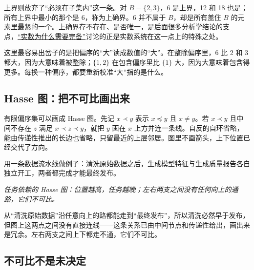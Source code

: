 上界则放弃了``必须在子集内''这一条。对 \(B=\{2,3\}\)，6 是上界，12 和 18 也是；所有上界中最小的那个是 6，称为上确界。6 并不属于 \(B\)，却是所有盖住 \(B\) 的元素里最紧的一个。上确界存不存在、是否唯一，是后面很多分析学结论的支点，\hyperref[ch:097]{``实数为什么需要完备''}讨论的正是实数系统在这一点上的特殊之处。

这里最容易出岔子的是把偏序的``大''读成数值的``大''。在整除偏序里，6 比 2 和 3 都大，因为大意味着被整除；\(\{1,2\}\) 在包含偏序里比 \(\{1\}\) 大，因为大意味着包含得更多。每换一种偏序，都要重新校准``大''指的是什么。

\subsection{Hasse 图：把不可比画出来}

有限偏序集可以画成 Hasse 图。先记 \(x\prec y\) 表示 \(x\preceq y\) 且 \(x\neq y\)。若 \(x\prec y\) 且中间不存在 \(z\) 满足 \(x\prec z\prec y\)，就把 \(y\) 画在 \(x\) 上方并连一条线。自反的自环省略，能由传递性推出的长边也省略，只留最近的上层邻居。图里不画箭头，上下位置已经交代了方向。

用一条数据流水线做例子：清洗原始数据之后，生成模型特征与生成质量报告各自独立开工，两者都完成才能最终发布。

\begin{center}

\emph{任务依赖的 Hasse 图：位置越高，任务越晚；左右两支之间没有任何向上的通路，它们不可比。}
\end{center}

从``清洗原始数据''沿任意向上的路都能走到``最终发布''，所以清洗必然早于发布，但图上这两点之间没有直接连线——这条关系已由中间节点和传递性给出，画出来是冗余。左右两支之间上下都走不通，它们不可比。

\subsection{不可比不是未决定}

